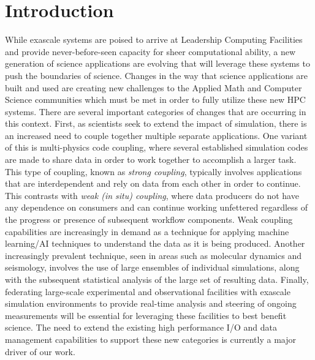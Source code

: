 \section{Introduction 
}


While exascale systems are poised to arrive at Leadership Computing Facilities and provide never-before-seen capacity for sheer computational ability, a new generation of science applications are evolving that will leverage these systems to push the boundaries of science. Changes in the way that science applications are built and used are creating new challenges to the Applied Math and Computer Science communities which must be met in order to fully utilize these new HPC systems. 
There are several important categories of changes that are occurring in this context.
First, as scientists seek to extend the impact of simulation, there is an increased need to couple together multiple separate applications. One variant of this is multi-physics code coupling, where several established simulation codes are made to share data in order to work together to accomplish a larger task. This type of coupling, known as \textit{strong coupling}, typically involves applications that are interdependent and rely on data from each other in order to continue. This contrasts with \textit{weak (in situ) coupling}, where data producers do not have any dependence on consumers and can continue working unfettered regardless of the progress or presence of subsequent workflow components. Weak coupling capabilities are increasingly in demand as a technique for applying machine learning/AI techniques to understand the data as it is being produced.
Another increasingly prevalent technique, seen in areas such as molecular dynamics and seismology, involves the use of large ensembles of individual simulations, along with the subsequent statistical analysis of the large set of resulting data.
Finally, federating large-scale experimental and observational facilities with exascale simulation environments to provide real-time analysis and steering of ongoing measurements will be essential for leveraging these facilities to best benefit science.
The need to extend the existing high performance I/O and data management capabilities to support these new categories is currently a major driver of our work. 
